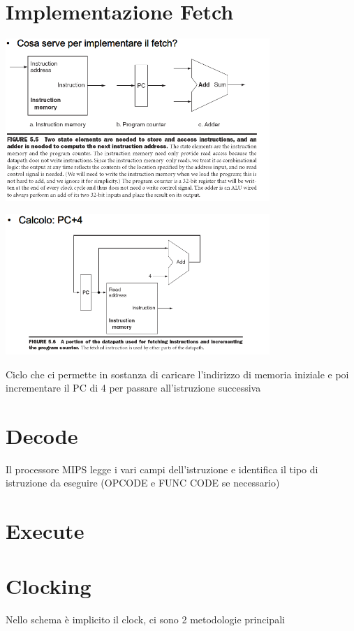 \documentclass[12pt, a4paper, openany]{book}
\begin{document}
\section{Implementazione Fetch}
\begin{center}
    \includegraphics[width=100mm, scale=0.5]{Implementazione fetch.png}
\end{center}
\begin{center}
    \includegraphics[width=100mm, scale=0.5]{Fetch PC+4.png}
\end{center}
Ciclo che ci permette in sostanza di caricare l'indirizzo di memoria iniziale e
poi incrementare il PC di 4 per passare all'istruzione successiva
\section*{Decode}
Il processore MIPS legge i vari campi dell'istruzione e identifica il tipo di istruzione
da eseguire (OPCODE e FUNC CODE se necessario)
\section*{Execute}
\section*{Clocking}
Nello schema è implicito il clock, ci sono 2 metodologie principali
\end{document}
